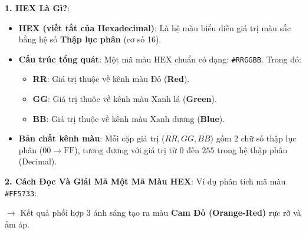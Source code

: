 \documentclass[11pt,oneside]{book}
\newcommand{\thd}[1]{\textcolor{white}{\textbf{\strut #1}}}
\newcommand{\codeinline}[1]{\textcolor{accentOrange}{\texttt{#1}}}
\newcommand{\term}[1]{\textbf{\textcolor{primaryBlue}{#1}}}
\begin{document}
\begin{conceptBox}
\textbf{1. HEX Là Gì?}:
\begin{itemize}[leftmargin=1.5em, itemsep=3pt, parsep=0pt]
    \item \textbf{HEX (viết tắt của Hexadecimal)}: Là hệ màu biểu diễn giá trị màu sắc bằng hệ số \term{Thập lục phân} (cơ số 16).
    \item \textbf{Cấu trúc tổng quát}: Một mã màu HEX chuẩn có dạng: \codeinline{\#RRGGBB}. Trong đó:
    \begin{itemize}[leftmargin=1.2em, itemsep=2pt]
        \item \textbf{RR}: Giá trị thuộc về kênh màu Đỏ (\term{Red}).
        \item \textbf{GG}: Giá trị thuộc về kênh màu Xanh lá (\term{Green}).
        \item \textbf{BB}: Giá trị thuộc về kênh màu Xanh dương (\term{Blue}).
    \end{itemize}
    \item \textbf{Bản chất kênh màu}: Mỗi cặp giá trị ($RR, GG, BB$) gồm 2 chữ số thập lục phân ($00 \rightarrow \text{FF}$), tương đương với giá trị từ $0$ đến $255$ trong hệ thập phân (Decimal).
\end{itemize}

\textbf{2. Cách Đọc Và Giải Mã Một Mã Màu HEX}:
Ví dụ phân tích mã màu \codeinline{\#FF5733}:
\begin{center}
\small\sffamily
{}
\end{center}
$\rightarrow$ Kết quả phối hợp 3 ánh sáng tạo ra màu \textbf{Cam Đỏ (Orange-Red)} rực rỡ và ấm áp.
\end{conceptBox}
\end{document}
